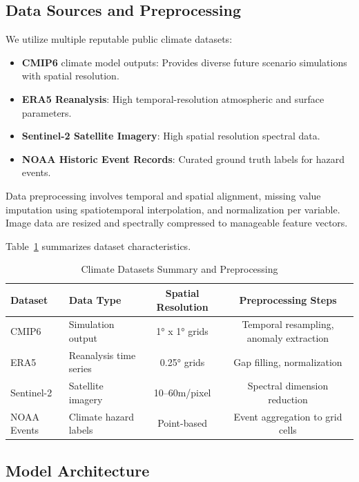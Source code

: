 \subsection{Data Sources and Preprocessing}

We utilize multiple reputable public climate datasets:

\begin{itemize}
  \item \textbf{CMIP6} climate model outputs: Provides diverse future scenario simulations with spatial resolution.
  \item \textbf{ERA5 Reanalysis}: High temporal-resolution atmospheric and surface parameters.
  \item \textbf{Sentinel-2 Satellite Imagery}: High spatial resolution spectral data.
  \item \textbf{NOAA Historic Event Records}: Curated ground truth labels for hazard events.
\end{itemize}

Data preprocessing involves temporal and spatial alignment, missing value imputation using spatiotemporal interpolation, and normalization per variable. Image data are resized and spectrally compressed to manageable feature vectors.

Table~\ref{tab:data-summary} summarizes dataset characteristics.

\begin{table}[h]
\centering
\caption{Climate Datasets Summary and Preprocessing}
\begin{tabular}{@{}llcc@{}}
\toprule
Dataset & Data Type & Spatial Resolution & Preprocessing Steps \\ \midrule
CMIP6 & Simulation output & 1° x 1° grids & Temporal resampling, anomaly extraction \\
ERA5 & Reanalysis time series & 0.25° grids & Gap filling, normalization \\
Sentinel-2 & Satellite imagery & 10–60m/pixel & Spectral dimension reduction \\
NOAA Events & Climate hazard labels & Point-based & Event aggregation to grid cells \\ \bottomrule
\end{tabular}
\label{tab:data-summary}
\end{table}

\subsection{Model Architecture}

